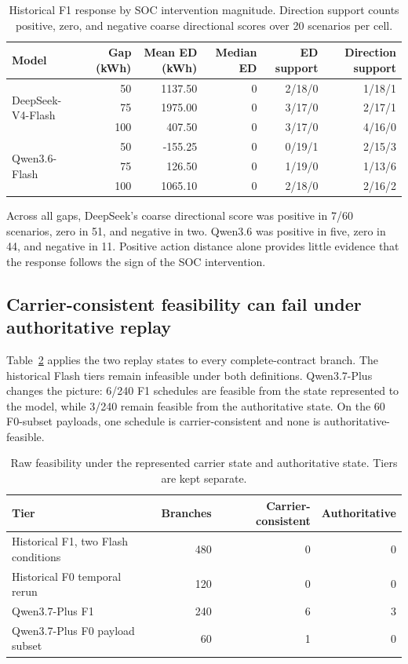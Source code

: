 \documentclass[11pt]{article}
\begin{document}
\begin{table}[!htbp]
\centering
\caption{Historical F1 response by SOC intervention magnitude. Direction support counts positive,
zero, and negative coarse directional scores over 20 scenarios per cell.}
\label{tab:dose}
\small
\begin{tabular}{@{}lrrrrr@{}}
\toprule
Model & Gap (kWh) & Mean ED (kWh) & Median ED & ED support & Direction support \\
\midrule
\multirow{3}{*}{DeepSeek-V4-Flash}
 & 50  & 1137.50 & 0 & 2/18/0 & 1/18/1 \\
 & 75  & 1975.00 & 0 & 3/17/0 & 2/17/1 \\
 & 100 & 407.50  & 0 & 3/17/0 & 4/16/0 \\
\midrule
\multirow{3}{*}{Qwen3.6-Flash}
 & 50  & -155.25 & 0 & 0/19/1 & 2/15/3 \\
 & 75  & 126.50  & 0 & 1/19/0 & 1/13/6 \\
 & 100 & 1065.10 & 0 & 2/18/0 & 2/16/2 \\
\bottomrule
\end{tabular}
\end{table}

Across all gaps, DeepSeek's coarse directional score was positive in 7/60 scenarios, zero in 51,
and negative in two. Qwen3.6 was positive in five, zero in 44, and negative in 11. Positive action
distance alone provides little evidence that the response follows the sign of the SOC intervention.

\subsection{Carrier-consistent feasibility can fail under authoritative replay}

Table~\ref{tab:dual-replay} applies the two replay states to every complete-contract branch. The
historical Flash tiers remain infeasible under both definitions. Qwen3.7-Plus changes the picture:
6/240 F1 schedules are feasible from the state represented to the model, while 3/240 remain
feasible from the authoritative state. On the 60 F0-subset payloads, one schedule is
carrier-consistent and none is authoritative-feasible.

\begin{table}[!htbp]
\centering
\caption{Raw feasibility under the represented carrier state and authoritative state. Tiers are
kept separate.}
\label{tab:dual-replay}
\small
\begin{tabular}{@{}lrrr@{}}
\toprule
Tier & Branches & Carrier-consistent & Authoritative \\
\midrule
Historical F1, two Flash conditions & 480 & 0 & 0 \\
Historical F0 temporal rerun & 120 & 0 & 0 \\
Qwen3.7-Plus F1 & 240 & 6 & 3 \\
Qwen3.7-Plus F0 payload subset & 60 & 1 & 0 \\
\bottomrule
\end{tabular}
\end{table}
\end{document}
